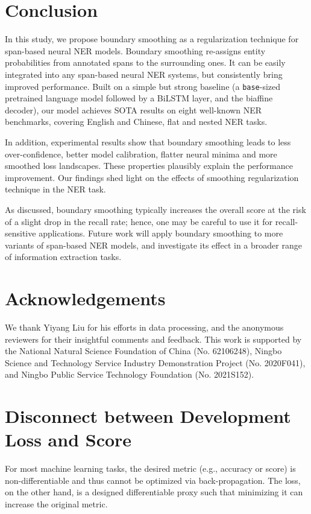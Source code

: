 \documentclass[11pt]{article}
\begin{document}
\section{Conclusion}
In this study, we propose boundary smoothing as a regularization technique for span-based neural NER models. Boundary smoothing re-assigns entity probabilities from annotated spans to the surrounding ones. It can be easily integrated into any span-based neural NER systems, but consistently bring improved performance. Built on a simple but strong baseline (a \texttt{base}-sized pretrained language model followed by a BiLSTM layer, and the biaffine decoder), our model achieves SOTA results on eight well-known NER benchmarks, covering English and Chinese, flat and nested NER tasks. 

In addition, experimental results show that boundary smoothing leads to less over-confidence, better model calibration, flatter neural minima and more smoothed loss landscapes. These properties plausibly explain the performance improvement. Our findings shed light on the effects of smoothing regularization technique in the NER task. 

As discussed, boundary smoothing typically increases the overall  score at the risk of a slight drop in the recall rate; hence, one may be careful to use it for recall-sensitive applications. Future work will apply boundary smoothing to more variants of span-based NER models, and investigate its effect in a broader range of information extraction tasks. 


\section*{Acknowledgements}
We thank Yiyang Liu for his efforts in data processing, and the anonymous reviewers for their insightful comments and feedback. This work is supported by the National Natural Science Foundation of China (No. 62106248), Ningbo Science and Technology Service Industry Demonstration Project (No. 2020F041), and Ningbo Public Service Technology Foundation (No. 2021S152). 






\newpage
\appendix

\section{Disconnect between Development Loss and  Score} \label{sec:dev-loss}
For most machine learning tasks, the desired metric (e.g., accuracy or  score) is non-differentiable and thus cannot be optimized via back-propagation. The loss, on the other hand, is a designed differentiable proxy such that minimizing it can increase the original metric. 
\end{document}
